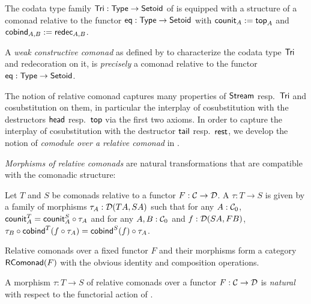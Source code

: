 \documentclass[envcountsame]{llncs}
\begin{document}
\begin{example}\label{ex:tri_comonad}
  The codata type family $\Tri : \Set \to \Setoid$ of  is equipped with a structure of a comonad relative to the functor 
  $\eq : \Set \to \Setoid$ with
   $\counit_A := \head_A$ and
   $\cobind_{A,B} := \redec_{A,B}$.
\end{example}

\begin{Long}
\begin{remark}
  A \emph{weak constructive comonad} as defined by \textcite{DBLP:conf/types/MatthesP11} to characterize the codata type $\Tri$
  and redecoration on it, is \emph{precisely}
  a comonad relative to the functor $\eq : \Set\to\Setoid$.
\end{remark}
\end{Long}

The notion of relative comonad captures many properties of $\stream$ resp.\ $\Tri$ and cosubstitution on them, in particular the interplay
of cosubstitution with the destructors $\shead$ resp.\ $\head$ via the first two axioms.
In order to  capture the interplay 
of cosubstitution  with the destructor $\stail$ resp.\ $\tail$,  we develop the notion of \emph{comodule over a relative comonad}
 in . 



\begin{Long}
\emph{Morphisms of relative comonads} are natural transformations that are compatible with the comonadic structure:
\end{Long}
\begin{definition}%
\label{def:comonad_morphism}
 Let $T$ and $S$ be comonads relative to a functor $F : \C \to \D$. A  $\tau : T \to S$
  is given by a family of morphisms $\tau_A : \D(TA,SA)$ such that for any $A : \C_0$,
     $  \counit^T_A = \comp{\tau_A}{\counit^S_A} $
   and for any $A,B : \C_0$ and $f : \D(SA,FB)$,
   $  \comp{\cobind^T(\comp{\tau_A}{f})}{\tau_B} = \comp{\tau_A}{\cobind^S(f)}$.
\end{definition}

Relative comonads over a fixed functor $F$ and their morphisms form a category $\RComonad(F)$ with the obvious identity and composition operations.

\begin{remark}
A morphism $\tau : T\to S$ of relative comonads over a functor $F:\C\to\D$ is  \emph{natural}
with respect to the functorial action of .
\end{remark}
\end{document}
